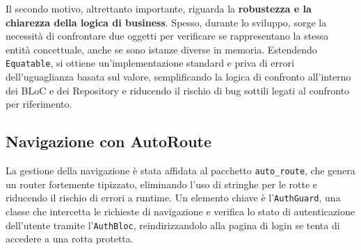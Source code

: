 Il secondo motivo, altrettanto importante, riguarda la \textbf{robustezza e la chiarezza della logica di business}.
Spesso, durante lo sviluppo, sorge la necessità di confrontare due oggetti per verificare se rappresentano la stessa entità concettuale, anche se sono istanze diverse in memoria.
Estendendo \texttt{Equatable}, si ottiene un'implementazione standard e priva di errori dell'uguaglianza basata sul valore, semplificando la logica di confronto all'interno dei BLoC e dei Repository e riducendo il rischio di bug sottili legati al confronto per riferimento.

\subsection{Navigazione con AutoRoute}\label{subsec:navigazione-con-autoroute}
La gestione della navigazione è stata affidata al pacchetto \texttt{auto\_route}, che genera un router fortemente tipizzato, eliminando l'uso di stringhe per le rotte e riducendo il rischio di errori a runtime.
Un elemento chiave è l'\texttt{AuthGuard}, una classe che intercetta le richieste di navigazione e verifica lo stato di autenticazione dell'utente tramite l'\texttt{AuthBloc}, reindirizzandolo alla pagina di login se tenta di accedere a una rotta protetta.

